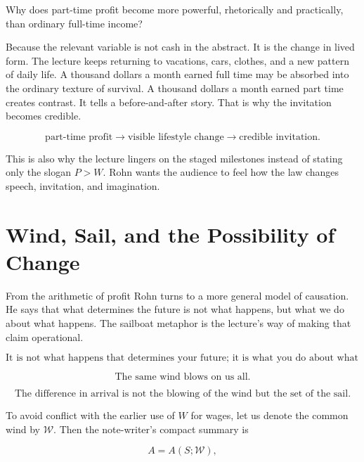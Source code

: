 Why does part-time profit become more powerful, rhetorically and practically, than ordinary full-time income?

Because the relevant variable is not cash in the abstract. It is the change in lived form. The lecture keeps returning to vacations, cars, clothes, and a new pattern of daily life. A thousand dollars a month earned full time may be absorbed into the ordinary texture of survival. A thousand dollars a month earned part time creates contrast. It tells a before-and-after story. That is why the invitation becomes credible.

\begin{equation}
\text{part-time profit} \longrightarrow \text{visible lifestyle change} \longrightarrow \text{credible invitation.}
\end{equation}

This is also why the lecture lingers on the staged milestones instead of stating only the slogan \(P>W\). Rohn wants the audience to feel how the law changes speech, invitation, and imagination.

\section{Wind, Sail, and the Possibility of Change}

From the arithmetic of profit Rohn turns to a more general model of causation. He says that what determines the future is not what happens, but what we do about what happens. The sailboat metaphor is the lecture's way of making that claim operational.

\begin{equation}
\text{It is not what happens that determines your future; it is what you do about what happens.}
\end{equation}

\begin{equation}
\text{The same wind blows on us all.}
\end{equation}

\begin{equation}
\text{The difference in arrival is not the blowing of the wind but the set of the sail.}
\end{equation}

To avoid conflict with the earlier use of \(W\) for wages, let us denote the common wind by \(\mathcal{W}\). Then the note-writer's compact summary is

\begin{equation}
A = A(S;\mathcal{W}),
\end{equation}

